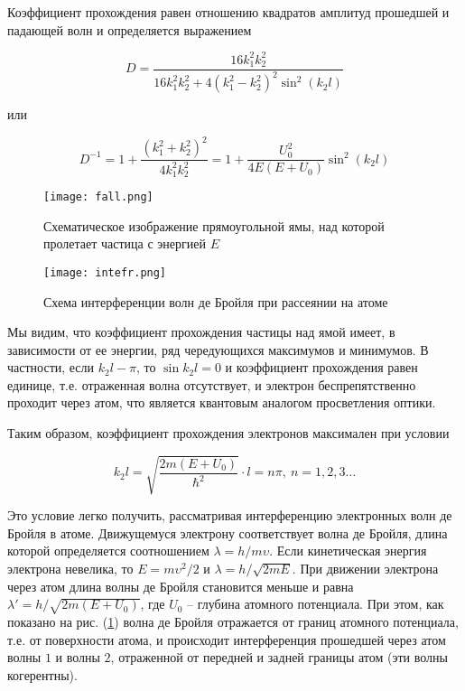 Коэффициент прохождения равен отношению квадратов амплитуд прошедшей и падающей
волн и определяется выражением

\begin{equation}
  D = \frac{16 k_1^2 k_2^2}
  {16 k_1^2 k_2^2 + 4 (k_1^2 - k_2^2)^2 \sin^2(k_2 l)}
\end{equation}

или

\begin{equation}
  D^{-1} = 1 + \frac{(k_1^2 + k_2^2)^2}{4 k_1^2 k_2^2}
   = 1 + \frac{U_0^2}{4 E (E + U_0)} \sin^2 (k_2 l)
\end{equation}

\begin{figure}
  \texttt{[image: fall.png]}
  \caption{Схематическое изображение прямоугольной ямы, над которой пролетает
  частица с энергией $E$}
  \label{pic::fall}

  \texttt{[image: intefr.png]}
  \caption{Схема интерференции волн де Бройля при рассеянии на атоме}
  \label{pic::interf}
\end{figure}

Мы видим, что коэффициент прохождения частицы над ямой имеет, в зависимости от
ее энергии, ряд чередующихся максимумов и минимумов. В частности, если $k_2 l -
\pi$, то $\sin k_2 l = 0$ и коэффициент прохождения равен единице, т.е.
отраженная волна отсутствует, и электрон беспрепятственно проходит через атом,
что является квантовым аналогом просветления оптики.

Таким образом, коэффициент прохождения электронов максимален при условии

\begin{equation} \label{eq::max_cond}
  k_2 l = \sqrt{\frac{2 m (E + U_0)}{\hbar^2}} \cdot l = n \pi, \: n = 1, 2, 3 \dots
\end{equation}

Это условие легко получить, рассматривая интерференцию электронных волн де
Бройля в атоме. Движущемуся электрону соответствует волна де Бройля, длина
которой определяется соотношением $\lambda = h / m \upsilon$. Если кинетическая
энергия электрона невелика, то $E = m \upsilon^2 / 2$ и $\lambda = h / \sqrt{2 m
E}$. При движении электрона через атом длина волны де Бройля становится меньше и
равна $\lambda'= h / \sqrt{2 m (E + U_0)}$, где $U_0$ -- глубина атомного
потенциала. При этом, как показано на рис. (\ref{pic::interf}) волна де Бройля
отражается от границ атомного потенциала, т.е. от поверхности атома, и
происходит интерференция прошедшей через атом волны $1$ и волны $2$, отраженной
от передней и задней границы атом (эти волны когерентны).


